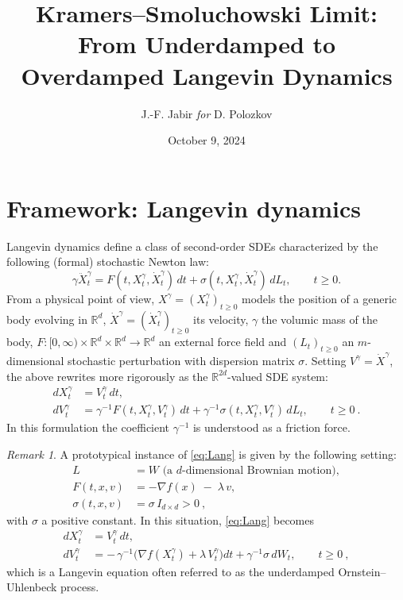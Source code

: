 \documentclass[12pt]{article}
\numberwithin{equation}{section}
\theoremstyle{remark}
\newtheorem{remark}{Remark}
\begin{document}
\title{Kramers--Smoluchowski Limit: From Underdamped to Overdamped Langevin Dynamics}
\author{J.-F. Jabir \textit{for} D. Polozkov}
\date{October 9, 2024}
\maketitle

\section{Framework: Langevin dynamics}

Langevin dynamics define a class of second-order SDEs characterized by the following (formal) stochastic Newton law: 
\[ 
\gamma \ddot{X}_t^\gamma = F(t, X_t^\gamma, \dot{X}_t^\gamma)\,dt + \sigma(t, X_t^\gamma, \dot{X}_t^\gamma)\,dL_t, \qquad t \ge 0. 
\] 
From a physical point of view, $X^\gamma = (X_t^\gamma)_{t\ge0}$ models the position of a generic body evolving in $\mathbb{R}^d$, $\dot{X}^\gamma = (\dot{X}_t^\gamma)_{t\ge0}$ its velocity, $\gamma$ the volumic mass of the body, $F: [0,\infty)\times \mathbb{R}^d \times \mathbb{R}^d \to \mathbb{R}^d$ an external force field and $(L_t)_{t\ge0}$ an $m$-dimensional stochastic perturbation with dispersion matrix $\sigma$. Setting $V^\gamma = \dot{X}^\gamma$, the above rewrites more rigorously as the $\mathbb{R}^{2d}$-valued SDE system: 
\begin{equation}\label{eq:Lang}
\begin{aligned}
dX_t^\gamma &= V_t^\gamma\,dt, \\
dV_t^\gamma &= \gamma^{-1} F(t, X_t^\gamma, V_t^\gamma)\,dt + \gamma^{-1}\sigma(t, X_t^\gamma, V_t^\gamma)\,dL_t, \qquad t \ge 0~.
\end{aligned}
\end{equation} 
In this formulation the coefficient $\gamma^{-1}$ is understood as a friction force.

\begin{remark}
A prototypical instance of \eqref{eq:Lang} is given by the following setting: 
\begin{equation}\label{eq:protoSetting}
\begin{aligned}
L &= W \text{ (a $d$-dimensional Brownian motion)},\\
F(t,x,v) &= -\nabla f(x)\;-\;\lambda\,v,\\
\sigma(t,x,v) &= \sigma\,I_{d\times d} > 0~,
\end{aligned}
\end{equation}
with $\sigma$ a positive constant. In this situation, \eqref{eq:Lang} becomes 
\begin{equation}\label{eq:OU}
\begin{aligned}
dX_t^\gamma &= V_t^\gamma\,dt, \\
dV_t^\gamma &= -\,\gamma^{-1}\!\big(\nabla f(X_t^\gamma) + \lambda\,V_t^\gamma\big)dt + \gamma^{-1}\sigma\,dW_t, \qquad t \ge 0~,
\end{aligned}
\end{equation}
which is a Langevin equation often referred to as the underdamped Ornstein–Uhlenbeck process.
\end{remark}
\end{document}
